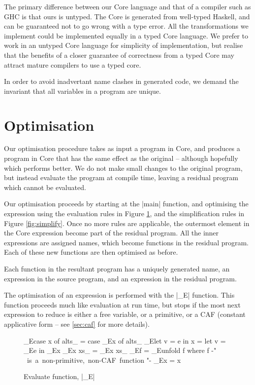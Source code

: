 \documentclass{llncs}
\begin{document}
The primary difference between our Core language and that of a compiler such as GHC is that ours is untyped. The Core is generated from well-typed Haskell, and can be guaranteed not to go wrong with a type error. All the transformations we implement could be implemented equally in a typed Core language. We prefer to work in an untyped Core language for simplicity of implementation, but realise that the benefits of a closer guarantee of correctness from a typed Core may attract mature compilers to use a typed core.

In order to avoid inadvertant name clashes in generated code, we demand the invariant that all variables in a program are unique.

\section{Optimisation}

Our optimisation procedure takes as input a program in Core, and produces a program in Core that has the same effect as the original -- although hopefully which performs better. We do not make small changes to the original program, but instead evaluate the program at compile time, leaving a residual program which cannot be evaluated.

Our optimisation proceeds by starting at the |main| function, and optimising the expression using the evaluation rules in Figure \ref{fig:evaluate}, and the simplification rules in Figure \ref{fig:simplify}. Once no more rules are applicable, the outermost element in the Core expression become part of the residual program. All the inner expressions are assigned names, which become functions in the residual program. Each of these new functions are then optimised as before.

Each function in the resultant program has a uniquely generated name, an expression in the source program, and an expression in the residual program.

The optimisation of an expression is performed with the |_E| function. This function proceeds much like evaluation at run time, but stops if the most next expression to reduce is either a free variable, or a primitive, or a CAF (constant applicative form -- see \ref{sec:caf} for more details).


\begin{figure}[tb]
\begin{code}
_E\<case x of alts_  \> =  case _E\<x\> of alts_
_E\<let v = e in x   \> =  let v = _E\<e\> in _E\<x\>
_E\<x xs_            \> =  _E\<x\> xs_
_E\<f                \> =  _E\<unfold f\>
                           where f {-" \hbox{ is a non-primitive, non-CAF function} "-}
_E\<x                \> =  x
\end{code}
\caption{Evaluate function, |_E|}
\label{fig:evaluate}
\end{figure}
\end{document}
